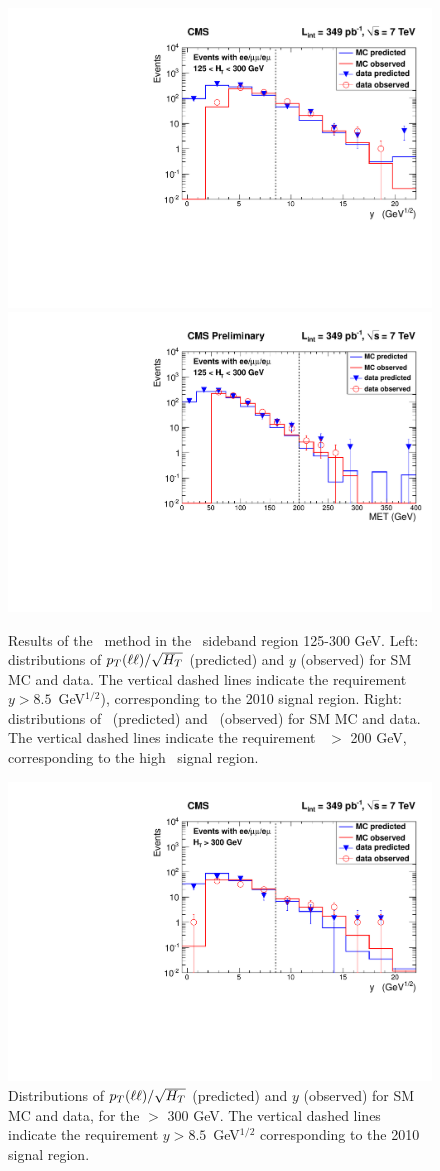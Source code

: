 \begin{figure}[h!]
\begin{center}
\includegraphics[width=0.48\linewidth]{plots/victory_y_control_349pb.pdf}
\includegraphics[width=0.48\linewidth]{plots/victory_met200_control_349pb.pdf}
\caption{\label{fig:victorycontrol}\protect 
Results of the \ptll\ method in the \Ht\ sideband region 125-300 GeV.
Left:  distributions of $p_T(\ell\ell)/\sqrt{H_T}$ (predicted) and $y$ (observed) for 
SM MC and data. The vertical dashed lines indicate the requirement $y > 8.5$~GeV$^{1/2}$),
corresponding to the 2010 signal region.
Right: distributions of \ptll\ (predicted) and \met\ (observed) for 
SM MC and data. The vertical dashed lines indicate the requirement \met\ $>$ 200 GeV,
corresponding to the high \Ht\ signal region.
}
\end{center}
\end{figure}


\begin{figure}[h!]
\begin{center}
\includegraphics[width=0.6\linewidth]{plots/victory_y_ht300_349pb.pdf}
\caption{\label{fig:vic1}\protect 
Distributions of $p_T(\ell\ell)/\sqrt{H_T}$ (predicted) and $y$ (observed) for 
SM MC and data, for the \Ht $>$ 300 GeV. 
The vertical dashed lines indicate the requirement $y > 8.5$~GeV$^{1/2}$ corresponding to the 2010 signal region.
}
\end{center}
\end{figure}

